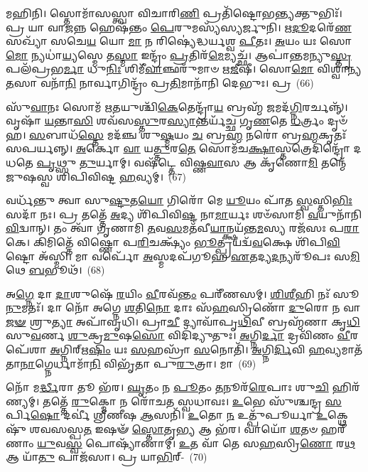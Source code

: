 𑌮𑌹𑌿𑌨𑌿। 𑌸𑍍𑌤𑍋𑌮𑌾᳴𑌸𑌸𑍍𑌤𑍍𑌵𑌾 𑌵𑌿𑌚𑌾𑌰𑌿\-\ul{𑌣𑌿} 𑌪𑍍𑌰𑌤𑌿᳴𑌷𑍍𑌟𑍋𑌭\-\ul{𑌨𑍍𑌤𑍍𑌯}\-𑌕𑍍𑌤𑍁𑌭𑌿𑌃᳴। 𑌪𑍍𑌰 𑌯𑌾 𑌵𑌾\-\ul{𑌜}\-𑌨𑍍𑌨 𑌹𑍇𑌷᳴𑌨𑍍𑌤𑌂 \ul{𑌪𑍇}\-𑌰𑍁𑌮𑌸𑍍𑌯᳴𑌸𑍍𑌯𑌰𑍍𑌜𑍁𑌨𑌿। \ul{𑌋}\-\-\ul{𑌦𑍂}\-𑌦𑌰𑍇᳴\-\ul{𑌣} 𑌸𑌖𑍍𑌯𑌾᳴ 𑌸𑌚𑍇\-\ul{𑌯} 𑌯𑍋 \ul{𑌮𑌾} 𑌨 𑌰𑌿𑌷𑍍𑌯𑍇॑𑌦𑍍𑌧𑌰𑍍𑌯𑌶𑍍𑌵 \ul{𑌪𑍀}\-𑌤𑌃। \ul{𑌅}\-𑌯𑌂 𑌯𑌃 𑌸𑍋\-\ul{𑌮𑍋} 𑌨𑍍𑌯𑌧𑌾॑\-\ul{𑌯𑍍𑌯}\-𑌸𑍍𑌮𑍇 𑌤\-\ul{𑌸𑍍𑌮𑌾} 𑌇𑌨𑍍𑌦𑍍𑌰𑌂᳴ \ul{𑌪𑍍𑌰}\-𑌤𑌿𑌰᳴\-\ul{𑌮𑍇}\-𑌮𑍍𑌯𑌚𑍍𑌛᳴। 𑌆𑌪𑌾॑𑌨𑍍𑌤𑌮𑌨𑍍𑌯𑍁\-\ul{𑌸𑍍𑌤𑍃}\-𑌪𑌲᳴𑌪𑍍𑌰𑌭\-\ul{𑌰𑍍𑌮𑌾} 𑌧𑍁\-\ul{𑌨𑌿𑌃} 𑌶𑌿𑌮𑍀᳴\-\ul{𑌵𑌾}\-𑌞𑍍𑌛𑌰𑍁᳴𑌮𑌾𑍞 𑌋\-\ul{𑌜𑍀}\-𑌷𑍀। 𑌸𑍋\-\ul{𑌮𑍋} 𑌵𑌿𑌶𑍍𑌵𑌾॑𑌨𑍍𑌯\-\ul{𑌤}\-𑌸𑌾 𑌵𑌨𑌾᳴\-\ul{𑌨𑌿} 𑌨𑌾𑌰𑍍𑌵𑌾𑌗𑌿𑌨𑍍𑌦𑍍𑌰𑌂᳴ 𑌪𑍍𑌰\-\ul{𑌤𑌿}\-𑌮𑌾𑌨𑌾᳴𑌨𑌿 𑌦𑍇𑌭𑍁𑌃। 𑌪𑍍𑌰~(66)

𑌸𑍁᳴\-\ul{𑌵𑌾}\-𑌨𑌃 𑌸𑍋𑌮᳴ 𑌋\-\ul{𑌤}\-𑌯𑍁𑌶𑍍𑌚𑌿᳴\-\ul{𑌕𑍇}\-𑌤𑍇𑌨𑍍𑌦𑍍𑌰𑌾᳴\-\ul{𑌯} 𑌬𑍍𑌰𑌹𑍍𑌮᳴ \ul{𑌜}\-𑌮𑌦᳴\-\ul{𑌗𑍍𑌨𑌿}\-𑌰𑌰𑍍𑌚𑌨𑍍𑌨𑍍᳴। 𑌵𑍃𑌷𑌾᳴ \ul{𑌯}\-𑌨𑍍𑌤𑌾\-\ul{𑌸𑌿} 𑌶𑌵᳴𑌸\-\ul{𑌸𑍍𑌤𑍁}\-𑌰\-\ul{𑌸𑍍𑌯𑌾}\-𑌨𑍍𑌤𑌰𑍍𑌯᳴𑌚𑍍𑌛 𑌗𑍃\-\ul{𑌣}\-𑌤𑍇 \ul{𑌧}\-𑌰𑍍𑌤𑍍𑌰𑌂 𑌦𑍃𑍞᳴𑌹। \ul{𑌸}\-𑌬𑌾𑌧᳴\-\ul{𑌸𑍍𑌤𑍇} 𑌮𑌦᳴𑌞𑍍𑌚 𑌶𑍁\-\ul{𑌷𑍍𑌮}\-𑌯𑌂 \ul{𑌚} 𑌬𑍍𑌰\-\ul{𑌹𑍍𑌮} 𑌨𑌰𑍋॑ 𑌬𑍍𑌰\-\ul{𑌹𑍍𑌮}\-𑌕𑍃𑌤𑌃᳴ 𑌸𑌪𑌰𑍍𑌯𑌨𑍍𑌨𑍍। \ul{𑌅}\-𑌰𑍍𑌕𑍋 \ul{𑌵𑌾} 𑌯\-\ul{𑌤𑍍𑌤𑍁}\-𑌰\-\ul{𑌤𑍇} 𑌸𑍋𑌮᳴𑌚\-\ul{𑌕𑍍𑌷𑌾}\-𑌸𑍍𑌤𑌤𑍍𑌰𑍇𑌦𑌿𑌨𑍍𑌦𑍍𑌰𑍋᳴ 𑌦𑌧𑌤𑍇 \ul{𑌪𑍃}\-𑌥𑍍𑌸𑍁 \ul{𑌤𑍁}\-𑌰𑍍𑌯𑌾𑌮𑍍। 𑌵𑌷᳴𑌟𑍍𑌤𑍇 𑌵𑌿𑌷𑍍𑌣\-\ul{𑌵𑌾}\-𑌸 𑌆 𑌕𑍃᳴𑌣𑍋\-\ul{𑌮𑌿} 𑌤𑌨𑍍𑌮𑍇᳴ 𑌜𑍁𑌷𑌸𑍍𑌵 𑌶𑌿𑌪𑌿𑌵𑌿𑌷𑍍𑌟 \ul{𑌹}\-𑌵𑍍𑌯𑌮𑍍।~(67)

𑌵𑌰𑍍𑌧᳴𑌨𑍍𑌤𑍁 𑌤𑍍𑌵𑌾 𑌸𑍁\-\ul{𑌷𑍍𑌟𑍁}\-𑌤\-\ul{𑌯𑍋} 𑌗𑌿𑌰𑍋᳴ 𑌮𑍇 \ul{𑌯𑍂}\-𑌯𑌂 𑌪𑌾᳴𑌤 \ul{𑌸𑍍𑌵}\-𑌸𑍍𑌤𑌿\-\ul{𑌭𑌿𑌃} 𑌸𑌦𑌾᳴ 𑌨𑌃। 𑌪𑍍𑌰 𑌤𑌤𑍍𑌤𑍇᳴ \ul{𑌅}\-𑌦𑍍𑌯 𑌶𑌿᳴𑌪𑌿𑌵𑌿\-\ul{𑌷𑍍𑌟} 𑌨𑌾\-\ul{𑌮𑌾}\-𑌰𑍍𑌯𑌃 𑌶𑍞᳴𑌸𑌾𑌮𑌿 \ul{𑌵}\-𑌯𑍁𑌨𑌾᳴𑌨𑌿 \ul{𑌵𑌿}\-𑌦𑍍𑌵𑌾𑌨𑍍। 𑌤𑌂 𑌤𑍍𑌵𑌾᳴ 𑌗𑍃𑌣𑌾𑌮𑌿 \ul{𑌤}\-𑌵\-\ul{𑌸}\-𑌮𑌤᳴𑌵𑍀\-\ul{𑌯𑌾}\-𑌨𑍍𑌕𑍍𑌷𑌯᳴𑌨𑍍𑌤\-\ul{𑌮}\-𑌸𑍍𑌯 𑌰𑌜᳴𑌸𑌃 𑌪\-\ul{𑌰𑌾}\-𑌕𑍇। 𑌕𑌿𑌮𑌿𑌤𑍍𑌤𑍇᳴ 𑌵𑌿𑌷𑍍𑌣𑍋 𑌪\-\ul{𑌰𑌿}\-𑌚𑌕𑍍𑌷𑍍𑌯𑌂᳴ \ul{𑌭𑍂}\-𑌤𑍍𑌪𑍍𑌰𑌯𑌦𑍍𑌵᳴\-\ul{𑌵}\-𑌕𑍍𑌷𑍇 𑌶𑌿᳴𑌪𑌿\-\ul{𑌵𑌿}\-𑌷𑍍𑌟𑍋 𑌅᳴𑌸𑍍𑌮𑌿। 𑌮𑌾 𑌵𑌰𑍍𑌪𑍋᳴ \ul{𑌅}\-𑌸𑍍𑌮𑌦𑌪᳴𑌗𑍂𑌹 \ul{𑌏}\-𑌤𑌦𑍍𑌯\-\ul{𑌦}\-𑌨𑍍𑌯𑌰𑍂᳴𑌪𑌃 𑌸\-\ul{𑌮𑌿}\-𑌥𑍇 \ul{𑌬}\-𑌭𑍂𑌥᳴।~(68)

𑌅\-\ul{𑌗𑍍𑌨𑍇} 𑌦𑌾 \ul{𑌦𑌾}\-𑌶𑍁𑌷𑍇᳴ \ul{𑌰}\-𑌯𑌿𑌂 \ul{𑌵𑍀}\-𑌰𑌵᳴\-\ul{𑌨𑍍𑌤𑌂} 𑌪𑌰𑍀᳴𑌣𑌸𑌮𑍍। \ul{𑌶𑌿}\-\-\ul{𑌶𑍀}\-𑌹𑌿 𑌨𑌃᳴ 𑌸𑍂\-\ul{𑌨𑍁}\-𑌮𑌤𑌃᳴। 𑌦𑌾 𑌨𑍋᳴ 𑌅𑌗𑍍𑌨𑍇 \ul{𑌶}\-𑌤𑌿\-\ul{𑌨𑍋} 𑌦𑌾𑌃 𑌸᳴\-\ul{𑌹}\-𑌸𑍍𑌰𑌿𑌣𑍋᳴ \ul{𑌦𑍁}\-𑌰𑍋 𑌨 𑌵𑌾\-\ul{𑌜}\-\-\ul{𑍟} 𑌶𑍍𑌰𑍁\-\ul{𑌤𑍍𑌯𑌾} 𑌅𑌪𑌾᳴𑌵𑍃𑌧𑌿। 𑌪𑍍𑌰𑌾\-\ul{𑌚𑍀} 𑌦𑍍𑌯𑌾𑌵𑌾᳴𑌪𑍃\-\ul{𑌥𑌿}\-𑌵𑍀 𑌬𑍍𑌰𑌹𑍍𑌮᳴𑌣𑌾 𑌕𑍃\-\ul{𑌧𑌿} 𑌸𑍁\-\ul{𑌵}\-𑌰𑍍𑌣 \ul{𑌶𑍁}\-𑌕𑍍𑌰\-\ul{𑌮𑍁}\-𑌷\-\ul{𑌸𑍋} 𑌵𑌿𑌦𑌿᳴𑌦𑍍𑌯𑍁𑌤𑍁𑌃। \ul{𑌅}\-𑌗𑍍𑌨𑌿\-\ul{𑌰𑍍𑌦𑌾} 𑌦𑍍𑌰𑌵𑌿᳴𑌣𑌂 \ul{𑌵𑍀}\-𑌰𑌪𑍇᳴𑌶𑌾 \ul{𑌅}\-𑌗𑍍𑌨𑌿𑌰𑍍\mbox{}𑌋\-\ul{𑌷𑌿𑌂} 𑌯𑌃 \ul{𑌸}\-𑌹𑌸𑍍𑌰𑌾᳴ \ul{𑌸}\-𑌨𑍋𑌤𑌿᳴। \ul{𑌅}\-𑌗𑍍𑌨𑌿\-\ul{𑌰𑍍𑌦𑌿}\-𑌵𑌿 \ul{𑌹}\-𑌵𑍍𑌯𑌮𑌾𑌤᳴𑌤𑌾\-\ul{𑌨𑌾}\-𑌗𑍍𑌨𑍇𑌰𑍍𑌧𑌾𑌮𑌾᳴\-\ul{𑌨𑌿} 𑌵𑌿𑌭𑍃᳴𑌤𑌾 𑌪𑍁\-\ul{𑌰𑍁}\-𑌤𑍍𑌰𑌾। 𑌮𑌾~(69)

𑌨𑍋᳴ 𑌮\-\ul{𑌰𑍍𑌦𑍍𑌧𑍀}\-𑌰𑌾 𑌤𑍂 𑌭᳴𑌰। \ul{𑌘𑍃}\-𑌤𑌂 𑌨 \ul{𑌪𑍂}\-𑌤𑌂 \ul{𑌤}\-𑌨𑍂𑌰᳴\-\ul{𑌰𑍇}\-𑌪𑌾𑌃 𑌶𑍁\-\ul{𑌚𑌿} 𑌹𑌿𑌰᳴𑌣𑍍𑌯𑌮𑍍। 𑌤𑌤𑍍𑌤𑍇᳴ \ul{𑌰𑍁}\-𑌕𑍍𑌮𑍋 𑌨 𑌰𑍋᳴𑌚𑌤 𑌸𑍍𑌵𑌧𑌾𑌵𑌃। \ul{𑌉}\-𑌭𑍇 𑌸𑍁᳴𑌶𑍍𑌚𑌨𑍍𑌦𑍍𑌰 \ul{𑌸}\-𑌰𑍍𑌪𑌿\-\ul{𑌷𑍋} 𑌦𑌰𑍍𑌵𑍀॑ 𑌶𑍍𑌰𑍀𑌣𑍀𑌷 \ul{𑌆}\-𑌸𑌨𑌿᳴। \ul{𑌉}\-𑌤𑍋 \ul{𑌨} 𑌉𑌤𑍍𑌪𑍁᳴𑌪𑍂𑌰𑍍𑌯𑌾 \ul{𑌉}\-𑌕𑍍𑌥𑍇𑌷𑍁᳴ 𑌶𑌵𑌸𑌸𑍍𑌪\-\ul{𑌤} 𑌇𑌷𑍟᳴ \ul{𑌸𑍍𑌤𑍋}\-𑌤𑍃\-\ul{𑌭𑍍𑌯} 𑌆 𑌭᳴𑌰। 𑌵𑌾𑌯𑍋᳴ \ul{𑌶}\-𑌤𑍞 𑌹𑌰𑍀᳴𑌣𑌾𑌂 \ul{𑌯𑍁}\-𑌵\-\ul{𑌸𑍍𑌵} 𑌪𑍋𑌷𑍍𑌯𑌾᳴𑌣𑌾𑌮𑍍। \ul{𑌉}\-𑌤 𑌵𑌾᳴ 𑌤𑍇 𑌸\-\ul{𑌹}\-𑌸𑍍𑌰𑌿\-\ul{𑌣𑍋} 𑌰\-\ul{𑌥} 𑌆 𑌯𑌾᳴\-\ul{𑌤𑍁} 𑌪𑌾𑌜᳴𑌸𑌾। 𑌪𑍍𑌰 𑌯𑌾\-\ul{𑌭𑌿}\-𑌰𑍍-~(70)

